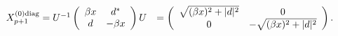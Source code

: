 \begin{equation}
\begin{array}{cc}
X^{(0){\rm diag}}_{p+1}=U^{-1} \left(
\begin{array}{cc}
\beta x & d^{*} \\
d & -\beta x
\end{array}
\right)
U &=
\left(
\begin{array}{cc}
\sqrt{(\beta x)^{2}+|d|^{2}}& 0 \\
0 & - \sqrt{(\beta x)^{2}+|d|^{2}}
\end{array}
\right) .
\end{array}\label{diagonal1}
\end{equation}

